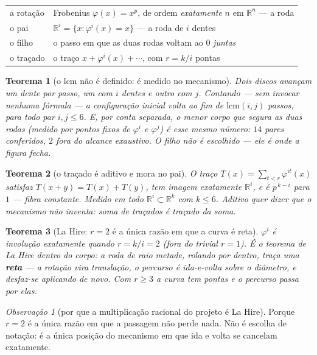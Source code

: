 \documentclass[11pt]{article}
\newcommand{\R}{\mathbb R}
\theoremstyle{plain}
\newtheorem{teorema}{Teorema}
\theoremstyle{remark}
\newtheorem{obs}{Observação}
\begin{document}
\begin{center}
\begin{tabular}{ll}
\toprule
a rotação & Frobenius $\varphi(x)=x^p$, de ordem \emph{exatamente} $n$ em $\R^n$ --- a roda\\
o pai & $\R^i=\{x:\varphi^i(x)=x\}$ --- a roda de $i$ dentes\\
o filho & o passo em que as duas rodas voltam ao $0$ \emph{juntas}\\
o traçado & o traço $x+\varphi^i(x)+\cdots$, com $r=k/i$ pontas\\
\bottomrule
\end{tabular}
\end{center}

\begin{teorema}[o $\mathrm{lcm}$ não é definido: é medido no mecanismo]
Dois discos avançam um dente por passo, um com $i$ dentes e outro com $j$. Contando --- sem invocar
nenhuma fórmula --- a configuração inicial volta ao fim de $\mathrm{lcm}(i,j)$ passos, para todo par
$i,j\le6$. E, por conta separada, o menor corpo que segura as duas rodas (medido por pontos fixos de
$\varphi^i$ e $\varphi^j$) é esse mesmo número: $14$ pares conferidos, $2$ fora do alcance
exaustivo. \emph{O filho não é escolhido --- ele é onde a figura fecha.}
\end{teorema}

\begin{teorema}[o traçado é aditivo e mora no pai]
O traço $T(x)=\sum_{t<r}\varphi^{it}(x)$ satisfaz $T(x+y)=T(x)+T(y)$, tem imagem exatamente $\R^i$, e
é $p^{\,k-i}$ para $1$ --- fibra constante. Medido em todo $\R^i\subset\R^k$ com $k\le6$. Aditivo quer
dizer que o mecanismo \emph{não inventa}: soma de traçados é traçado da soma.
\end{teorema}

\begin{teorema}[La Hire: $r=2$ é a única razão em que a curva é reta]
$\varphi^i$ é involução exatamente quando $r=k/i=2$ (fora do trivial $r=1$). É o teorema de La Hire
dentro do corpo: a roda de raio metade, rolando por dentro, traça uma \textbf{reta} --- a rotação vira
translação, o percurso é ida-e-volta sobre o diâmetro, e desfaz-se aplicando de novo. Com $r\ge3$ a
curva tem pontas e o percurso passa por elas.
\end{teorema}

\begin{obs}[por que a multiplicação racional do projeto é La Hire]
Porque $r=2$ é a única razão em que a passagem não perde nada. Não é escolha de notação: é a única
posição do mecanismo em que ida e volta se cancelam exatamente.
\end{obs}
\end{document}
